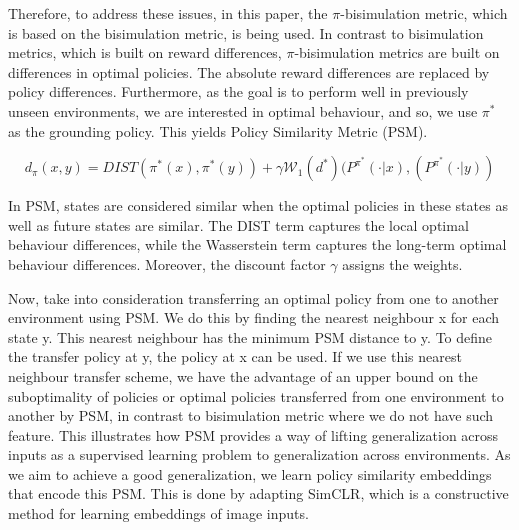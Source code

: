 \documentclass{usiinftr}
\begin{document}
Therefore, to address these issues, in this paper, the $\pi$-bisimulation metric, which is based on the bisimulation metric, is being used. In contrast to bisimulation metrics, which is built on reward differences, $\pi$-bisimulation metrics are built on differences in optimal policies. The absolute reward differences are replaced by policy differences. Furthermore, as the goal is to perform well in previously unseen environments, we are interested in optimal behaviour, and so, we use $\pi^*$ as the grounding policy. This yields Policy Similarity Metric (PSM).

\begin{equation}
    d_{\pi}(x,y) = DIST(\pi^*(x), \pi^*(y)) + \gamma \mathcal{W}_1(d^*) (P^{\pi^*}(\cdot | x), (P^{\pi^*}(\cdot | y)) 
\end{equation}

In PSM, states are considered similar when the optimal policies in these states as well as future states are similar. The DIST term captures the local optimal behaviour differences, while the Wasserstein term captures the long-term optimal behaviour differences. Moreover, the discount factor $\gamma$ assigns the weights.

Now, take into consideration transferring an optimal policy from one to another environment using PSM. We do this by finding the nearest neighbour x for each state y. This nearest neighbour has the minimum PSM distance to y. To define the transfer policy at y, the policy at x can be used. If we use this nearest neighbour transfer scheme, we have the advantage of an upper bound on the suboptimality of policies or optimal policies transferred from one environment to another by PSM, in contrast to bisimulation metric where we do not have such feature.  This illustrates how PSM provides a way of lifting generalization across inputs as a supervised learning problem to generalization across environments. As we aim to achieve a good generalization, we learn policy similarity embeddings that encode this PSM. This is done by adapting SimCLR, which is a constructive method for learning embeddings of image inputs.
\end{document}
